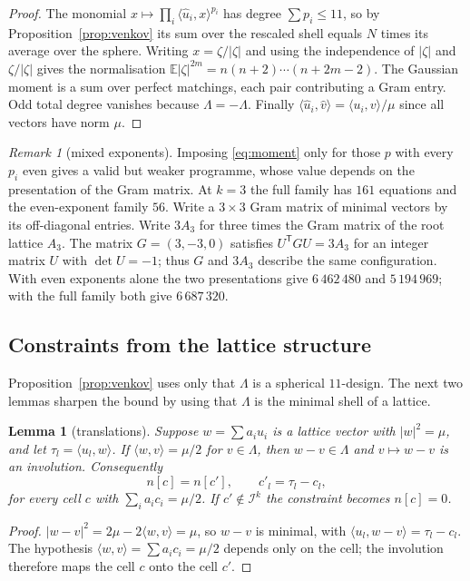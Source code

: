 \documentclass[11pt]{amsart}
\newtheorem{lemma}[theorem]{Lemma}
\theoremstyle{remark}
\newtheorem{remark}[theorem]{Remark}
\newcommand{\ip}[2]{\langle #1,#2\rangle}
\begin{document}
\begin{proof}
The monomial $x\mapsto\prod_i\ip{\hat u_i}{x}^{p_i}$ has degree $\sum p_i\le11$,
so by Proposition~\ref{prop:venkov} its sum over the rescaled shell equals $N$
times its average over the sphere. Writing $x=\zeta/|\zeta|$ and using the
independence of $|\zeta|$ and $\zeta/|\zeta|$ gives the normalisation
$\mathbb{E}|\zeta|^{2m}=n(n+2)\cdots(n+2m-2)$. The Gaussian moment is a sum over
perfect matchings, each pair contributing a Gram entry. Odd total degree
vanishes because $\Lambda=-\Lambda$. Finally
$\ip{\hat u_i}{\hat v}=\ip{u_i}{v}/\mu$ since all vectors have norm $\mu$.
\end{proof}

\begin{remark}[mixed exponents]\label{rem:mixed}
Imposing \eqref{eq:moment} only for those $p$ with every $p_i$ even gives a valid
but weaker programme, whose value depends on the presentation of the Gram matrix.
At $k=3$ the full family has $161$ equations and the even-exponent family $56$.
Write a $3\times3$ Gram matrix of minimal vectors by its off-diagonal entries.
Write $3A_3$ for three times the Gram matrix of the root lattice $A_3$. The
matrix $G=(3,-3,0)$ satisfies $U^{\mathsf T}GU=3A_3$ for an integer matrix $U$
with $\det U=-1$; thus $G$ and $3A_3$ describe the same configuration. With even
exponents alone the two presentations give $6\,462\,480$ and $5\,194\,969$; with
the full family both give $6\,687\,320$.
\end{remark}

\subsection{Constraints from the lattice structure}

Proposition~\ref{prop:venkov} uses only that $\Lambda$ is a spherical
$11$-design. The next two lemmas sharpen the bound by using that $\Lambda$ is the
minimal shell of a lattice.

\begin{lemma}[translations]\label{lem:trans}
Suppose $w=\sum a_iu_i$ is a lattice vector with $|w|^2=\mu$, and let
$\tau_l=\ip{u_l}{w}$. If $\ip{w}{v}=\mu/2$ for $v\in\Lambda$, then
$w-v\in\Lambda$ and $v\mapsto w-v$ is an involution. Consequently
\[
  n[c]=n[c'], \qquad c'_l=\tau_l-c_l ,
\]
for every cell $c$ with $\sum_i a_ic_i=\mu/2$. If $c'\notin\mathcal I^k$ the constraint
becomes $n[c]=0$.
\end{lemma}

\begin{proof}
$|w-v|^2=2\mu-2\ip{w}{v}=\mu$, so $w-v$ is minimal, with
$\ip{u_l}{w-v}=\tau_l-c_l$. The hypothesis $\ip{w}{v}=\sum a_ic_i=\mu/2$ depends
only on the cell; the involution therefore maps the cell $c$ onto the cell $c'$.
\end{proof}
\end{document}
